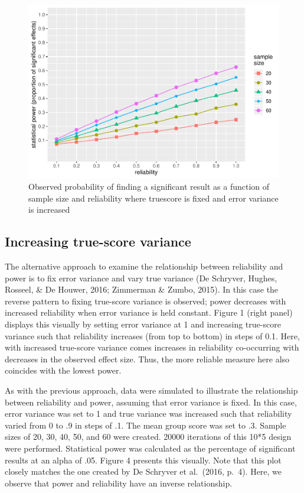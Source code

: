 \documentclass[english,,man]{apa6}
\begin{document}
\begin{figure}[H]
\includegraphics{visualising-reliability-and-power-relationships-v2_files/figure-latex/plotting3-1} \caption{Observed probability of finding a significant result as a function of sample size and reliability where truescore is fixed and error variance is increased}\label{fig:plotting3}
\end{figure}

\hypertarget{increasing-true-score-variance}{%
\subsection{Increasing true-score variance}\label{increasing-true-score-variance}}

The alternative approach to examine the relationship between reliability and power is to fix error variance and vary true variance (De Schryver, Hughes, Rosseel, \& De Houwer, 2016; Zimmerman \& Zumbo, 2015). In this case the reverse pattern to fixing true-score variance is observed; power decreases with increased reliability when error variance is held constant. Figure 1 (right panel) displays this visually by setting error variance at 1 and increasing true-score variance such that reliability increases (from top to bottom) in steps of 0.1. Here, with increased true-score variance comes increases in reliability co-occurring with decreases in the observed effect size. Thus, the more reliable measure here also coincides with the lowest power.

As with the previous approach, data were simulated to illustrate the relationship between reliability and power, assuming that error variance is fixed. In this case, error variance was set to 1 and true variance was increased such that reliability varied from 0 to .9 in steps of .1. The mean group score was set to .3. Sample sizes of 20, 30, 40, 50, and 60 were created. 20000 iterations of this 10*5 design were performed. Statistical power was calculated as the percentage of significant results at an alpha of .05. Figure 4 presents this visually. Note that this plot closely matches the one created by De Schryver et al.~(2016, p.~4). Here, we observe that power and reliability have an inverse relationship.
\end{document}
